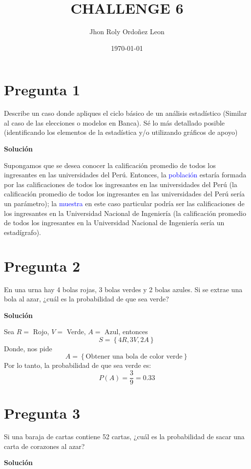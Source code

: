 \documentclass[11pt]{article}
\title{\textbf{CHALLENGE 6}} %
\author{Jhon Roly Ordoñez Leon} %
\date{\today} %
\begin{document}
	\maketitle
	\section{Pregunta 1}
	Describe un caso donde apliques el ciclo básico de un análisis estadístico (Similar al caso de las elecciones o modelos en Banca). Sé lo más detallado posible (identificando los elementos de la estadística y/o utilizando gráficos de apoyo)
		\begin{center}
			\textbf{Solución}
		\end{center}
	Supongamos que se desea conocer la calificación promedio de todos los ingresantes en las universidades del Perú. Entonces, la  \textcolor{blue}{población}
	estaría formada por las calificaciones de todos los ingresantes en las universidades del Perú (la calificación promedio de todos los ingresantes en las universidades del Perú sería un parámetro); la \textcolor{blue}{muestra} en este caso particular podría ser las calificaciones 
	de los ingresantes en la Universidad Nacional de Ingeniería (la calificación promedio de todos los ingresantes en la Universidad Nacional de Ingeniería sería un estadígrafo).
	
	\section{Pregunta 2}
	En una urna hay 4 bolas rojas, 3 bolas verdes y 2 bolas azules. Si se extrae una bola al azar, ¿cuál es la probabilidad de que sea verde? 
		\begin{center}
			\textbf{Solución}
		\end{center}
	
	Sea $R =$ Rojo, $V =$ Verde, $A=$ Azul, entonces
	\begin{equation}
		S = \left\{  4R, 3V, 2A \right\}
	\end{equation}
	Donde, nos pide 
	\begin{equation}
		A = \left\{  \text{Obtener una bola de color verde} \right\}
	\end{equation}
	Por lo tanto, la probabilidad de que sea verde es:
	\begin{equation}
		P(A ) = \dfrac{3}{9} = 0.33
	\end{equation}
	
	\section{Pregunta 3}
	Si una baraja de cartas contiene 52 cartas, ¿cuál es la probabilidad de sacar una carta de corazones al azar?
		\begin{center}
			\textbf{Solución}
		\end{center}
		
\end{document}
